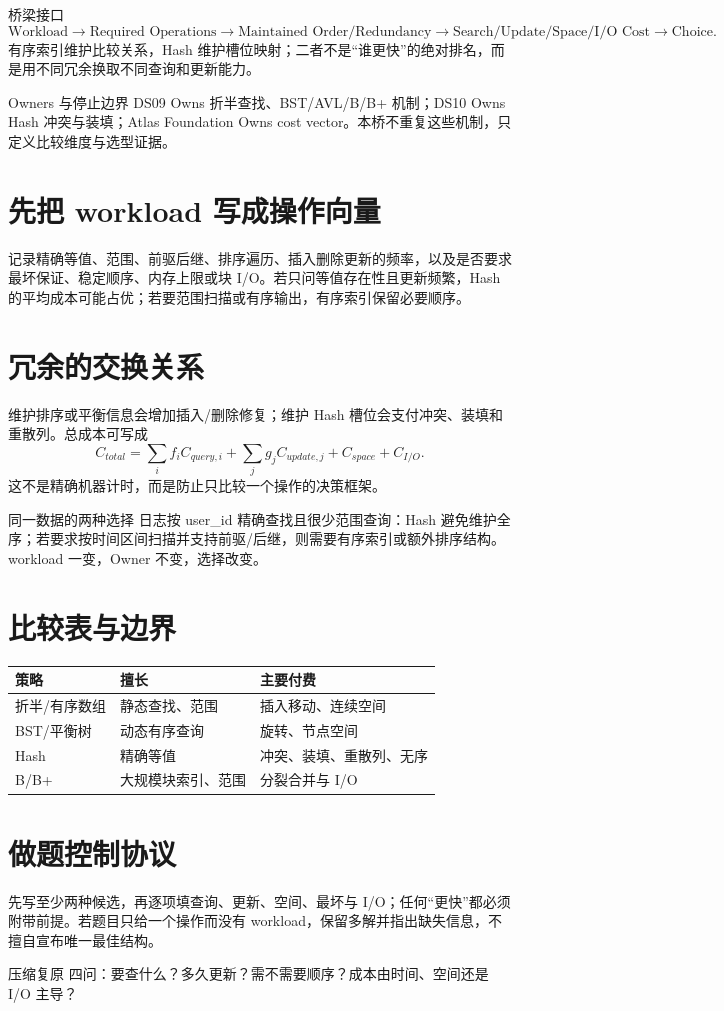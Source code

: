 \documentclass[UTF8,fontset=none,11pt,a4paper]{ctexart}
\begin{document}

\begin{corebox}{桥梁接口}
\[
\text{Workload}\to\text{Required Operations}\to\text{Maintained Order/Redundancy}\to\text{Search/Update/Space/I/O Cost}\to\text{Choice}.
\]
有序索引维护比较关系，Hash 维护槽位映射；二者不是“谁更快”的绝对排名，而是用不同冗余换取不同查询和更新能力。
\end{corebox}
\begin{methodbox}{Owners 与停止边界}
DS09 Owns 折半查找、BST/AVL/B/B+ 机制；DS10 Owns Hash 冲突与装填；Atlas Foundation Owns cost vector。本桥不重复这些机制，只定义比较维度与选型证据。
\end{methodbox}
\tableofcontents\newpage

\section{先把 workload 写成操作向量}
记录精确等值、范围、前驱后继、排序遍历、插入删除更新的频率，以及是否要求最坏保证、稳定顺序、内存上限或块 I/O。若只问等值存在性且更新频繁，Hash 的平均成本可能占优；若要范围扫描或有序输出，有序索引保留必要顺序。

\section{冗余的交换关系}
维护排序或平衡信息会增加插入/删除修复；维护 Hash 槽位会支付冲突、装填和重散列。总成本可写成
\[
C_{total}=\sum_i f_i C_{query,i}+\sum_j g_j C_{update,j}+C_{space}+C_{I/O}.
\]
这不是精确机器计时，而是防止只比较一个操作的决策框架。
\begin{examplebox}{同一数据的两种选择}
日志按 user\_id 精确查找且很少范围查询：Hash 避免维护全序；若要求按时间区间扫描并支持前驱/后继，则需要有序索引或额外排序结构。workload 一变，Owner 不变，选择改变。
\end{examplebox}

\section{比较表与边界}
\begin{center}\small
\begin{tabularx}{\linewidth}{L{2.4cm}YY}\toprule
策略 & 擅长 & 主要付费\\\midrule
折半/有序数组 & 静态查找、范围 & 插入移动、连续空间\\
BST/平衡树 & 动态有序查询 & 旋转、节点空间\\
Hash & 精确等值 & 冲突、装填、重散列、无序\\
B/B+ & 大规模块索引、范围 & 分裂合并与 I/O\\\bottomrule\end{tabularx}\end{center}

\section{做题控制协议}
先写至少两种候选，再逐项填查询、更新、空间、最坏与 I/O；任何“更快”都必须附带前提。若题目只给一个操作而没有 workload，保留多解并指出缺失信息，不擅自宣布唯一最佳结构。
\begin{corebox}{压缩复原}
四问：要查什么？多久更新？需不需要顺序？成本由时间、空间还是 I/O 主导？
\end{corebox}
\end{document}
